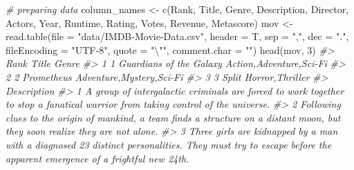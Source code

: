 \documentclass[
]{book}
\newenvironment{Shaded}{\begin{snugshade}}{\end{snugshade}}
\newcommand{\AttributeTok}[1]{\textcolor[rgb]{0.77,0.63,0.00}{#1}}
\newcommand{\CommentTok}[1]{\textcolor[rgb]{0.56,0.35,0.01}{\textit{#1}}}
\newcommand{\DecValTok}[1]{\textcolor[rgb]{0.00,0.00,0.81}{#1}}
\newcommand{\FunctionTok}[1]{\textcolor[rgb]{0.00,0.00,0.00}{#1}}
\newcommand{\NormalTok}[1]{#1}
\newcommand{\OtherTok}[1]{\textcolor[rgb]{0.56,0.35,0.01}{#1}}
\newcommand{\SpecialCharTok}[1]{\textcolor[rgb]{0.00,0.00,0.00}{#1}}
\newcommand{\StringTok}[1]{\textcolor[rgb]{0.31,0.60,0.02}{#1}}
\begin{document}
\begin{Shaded}
\begin{Highlighting}[]
\CommentTok{\# preparing data}
\NormalTok{column\_names }\OtherTok{\textless{}{-}} \FunctionTok{c}\NormalTok{(}\StringTok{\textquotesingle{}Rank\textquotesingle{}}\NormalTok{, }\StringTok{\textquotesingle{}Title\textquotesingle{}}\NormalTok{, }\StringTok{\textquotesingle{}Genre\textquotesingle{}}\NormalTok{, }\StringTok{\textquotesingle{}Description\textquotesingle{}}\NormalTok{, }\StringTok{\textquotesingle{}Director\textquotesingle{}}\NormalTok{, }\StringTok{\textquotesingle{}Actors\textquotesingle{}}\NormalTok{, }
                  \StringTok{\textquotesingle{}Year\textquotesingle{}}\NormalTok{, }\StringTok{\textquotesingle{}Runtime\textquotesingle{}}\NormalTok{, }\StringTok{\textquotesingle{}Rating\textquotesingle{}}\NormalTok{, }\StringTok{\textquotesingle{}Votes\textquotesingle{}}\NormalTok{, }\StringTok{\textquotesingle{}Revenue\textquotesingle{}}\NormalTok{, }\StringTok{\textquotesingle{}Metascore\textquotesingle{}}\NormalTok{)}
\NormalTok{mov }\OtherTok{\textless{}{-}} \FunctionTok{read.table}\NormalTok{(}\AttributeTok{file =} \StringTok{"data/IMDB{-}Movie{-}Data.csv"}\NormalTok{, }\AttributeTok{header =}\NormalTok{ T, }\AttributeTok{sep =} \StringTok{","}\NormalTok{, }\AttributeTok{dec =} \StringTok{"."}\NormalTok{, }\AttributeTok{fileEncoding =} \StringTok{"UTF{-}8"}\NormalTok{, }\AttributeTok{quote =} \StringTok{"}\SpecialCharTok{\textbackslash{}"}\StringTok{"}\NormalTok{,}
                  \AttributeTok{comment.char =} \StringTok{""}\NormalTok{)}
\FunctionTok{head}\NormalTok{(mov, }\DecValTok{3}\NormalTok{)}
\CommentTok{\#\textgreater{}   Rank                   Title                    Genre}
\CommentTok{\#\textgreater{} 1    1 Guardians of the Galaxy  Action,Adventure,Sci{-}Fi}
\CommentTok{\#\textgreater{} 2    2              Prometheus Adventure,Mystery,Sci{-}Fi}
\CommentTok{\#\textgreater{} 3    3                   Split          Horror,Thriller}
\CommentTok{\#\textgreater{}                                                                                                                                                     Description}
\CommentTok{\#\textgreater{} 1                               A group of intergalactic criminals are forced to work together to stop a fanatical warrior from taking control of the universe.}
\CommentTok{\#\textgreater{} 2                               Following clues to the origin of mankind, a team finds a structure on a distant moon, but they soon realize they are not alone.}
\CommentTok{\#\textgreater{} 3 Three girls are kidnapped by a man with a diagnosed 23 distinct personalities. They must try to escape before the apparent emergence of a frightful new 24th.}

\end{Highlighting}
\end{Shaded}
\end{document}
